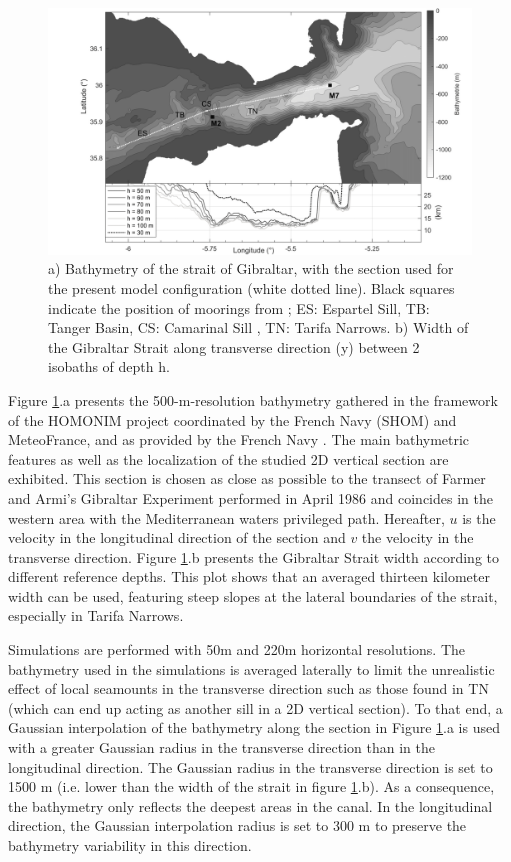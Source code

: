 \begin{figure}[!h]
\centering
 \includegraphics[width=1\textwidth]{./GBR2D/figure2.png}
 \caption[(a)Bathymetry of the strait of Gibraltar. (b) Width of the Gibraltar Strait.] { a) Bathymetry of the strait of Gibraltar, with the section used for the present model configuration (white dotted line). Black squares indicate the position of moorings from \citet{CW90}; ES: Espartel Sill, TB: Tanger Basin, CS: Camarinal Sill , TN: Tarifa Narrows. b) Width of the Gibraltar Strait along transverse direction (y) between 2 isobaths of depth h.}
 \label{Fig1}
\end{figure}

\indent Figure \ref{Fig1}.a presents the 500-m-resolution bathymetry gathered in the framework of the HOMONIM project coordinated by the French Navy (SHOM) and MeteoFrance, and as provided by the French Navy \citep{Biscara2016}. The  main bathymetric features as well as the localization of the studied 2D vertical section are exhibited. This section is chosen as close as possible to the transect of Farmer and Armi's Gibraltar Experiment performed in April 1986 \citep{FA1988} and coincides in the western area with the Mediterranean waters privileged path. Hereafter, $u$ is the velocity in the longitudinal direction of the section and $v$ the velocity in the transverse direction. Figure \ref{Fig1}.b presents the Gibraltar Strait width according to different reference depths. This plot shows that an averaged thirteen kilometer width can be used, featuring steep slopes at the lateral boundaries of the strait, especially in Tarifa Narrows.

Simulations are performed with 50m and 220m horizontal resolutions. The bathymetry used in the simulations is averaged laterally to limit the unrealistic effect of local seamounts in the transverse direction such as those found in TN (which can end up acting as another sill in a 2D vertical section). To that end, a Gaussian interpolation of the bathymetry along the section in Figure \ref{Fig1}.a is used with a greater Gaussian radius in the transverse direction than in the longitudinal direction. The Gaussian radius in the transverse direction is set to 1500 m (i.e. lower than the width of the strait in figure \ref{Fig1}.b). As a consequence, the bathymetry only reflects the deepest areas in the canal. In the longitudinal direction, the Gaussian interpolation radius is set to 300 m to preserve the bathymetry variability in this direction.

